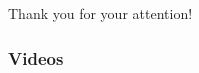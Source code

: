 \documentclass{beamer}
\begin{document}
 
\begin{frame} 
 
\begin{center}
\Huge{Thank you for your attention!}
\end{center} 
 
\end{frame} 
 
 
 
\begin{frame}
\frametitle{Videos} 
 
 
\end{frame}  
 
 
 
 
 
% 
% 
% 
% 
%
%  
 
 
 
 
 
 
\end{document}
